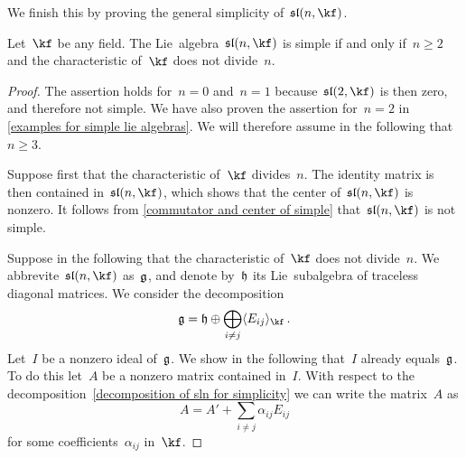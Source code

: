 \begin{fluff}
	We finish this  by proving the general simplicity of~$\sllie(n, \kf)$.
\end{fluff}


\begin{theorem}
	\label{sln is simple}
	Let~$\kf$ be any field.
	The Lie~algebra~$\sllie(n, \kf)$ is simple if and only if~$n \geq 2$ and the characteristic of~$\kf$ does not divide~$n$.
\end{theorem}


\begin{proof}
	The assertion holds for~$n = 0$ and~$n = 1$ because~$\sllie(2, \kf)$ is then zero, and therefore not simple.
	We have also proven the assertion for~$n = 2$ in \cref{examples for simple lie algebras}.
	We will therefore assume in the following that~$n \geq 3$.

	Suppose first that the characteristic of~$\kf$ divides~$n$.
	The identity matrix is then contained in~$\sllie(n, \kf)$, which shows that the center of~$\sllie(n, \kf)$ is nonzero.
	It follows from \cref{commutator and center of simple} that~$\sllie(n, \kf)$ is not simple.

	Suppose in the following that the characteristic of~$\kf$ does not divide~$n$.
	We abbrevite~$\sllie(n, \kf)$ as~$\mathfrak{g}$, and denote by~$\mathfrak{h}$ its Lie~subalgebra of traceless diagonal matrices.
	We consider the decomposition
	\begin{equation}
		\label{decomposition of sln for simplicity}
		\glie
		=
		\hlie \oplus \bigoplus_{i \neq j} \gen{ E_{ij} }_{\kf} \,.
	\end{equation}
	Let~$I$ be a nonzero ideal of~$\mathfrak{g}$.
	We show in the following that~$I$ already equals~$\mathfrak{g}$.
	To do this let~$A$ be a nonzero matrix contained in~$I$.
	With respect to the decomposition~\eqref{decomposition of sln for simplicity} we can write the matrix~$A$ as
	\[
		A = A' + \sum_{i \neq j} \alpha_{ij} E_{ij}
	\]
	for some coefficients~$\alpha_{ij}$ in~$\kf$.


\end{proof}
